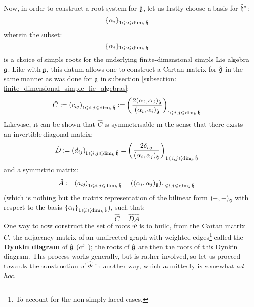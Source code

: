         Now, in order to construct a root system for $\hat{\mathfrak{g}}$, let us firstly choose a basis for $\hat{\mathfrak{h}}^*$:
            $$\{\alpha_i\}_{1 \leqslant i \leqslant \dim_k \hat{\mathfrak{h}}}$$
        wherein the subset:
            $$\{\alpha_i\}_{1 \leqslant i \leqslant \dim_k \mathfrak{h}}$$
        is a choice of simple roots for the underlying finite-dimensional simple Lie algebra $\mathfrak{g}$. Like with $\mathfrak{g}$, this datum allows one to construct a Cartan matrix for $\hat{\mathfrak{g}}$ in the same manner as was done for $\mathfrak{g}$ in subsection \ref{subsection: finite_dimensional_simple_lie_algebras}:
            $$\hat{C} := (c_{ij})_{1 \leqslant i, j \leqslant \dim_k \hat{\mathfrak{h}}} := \left( \frac{2(\alpha_i, \alpha_j)_{\hat{\mathfrak{g}}}}{(\alpha_i, \alpha_i)_{\hat{\mathfrak{g}}}} \right)_{1 \leqslant i, j \leqslant \dim_k \hat{\mathfrak{h}}}$$
        Likewise, it can be shown that $\hat{C}$ is symmetrisable in the sense that there exists an invertible diagonal matrix:
            $$\hat{D} := (d_{ij})_{1 \leqslant i, j \leqslant \dim_k \hat{\mathfrak{h}}} = \left(\frac{2\delta_{i, j}}{(\alpha_i, \alpha_j)_{\hat{\mathfrak{g}}}}\right)_{1 \leqslant i, j \leqslant \dim_k \hat{\mathfrak{h}}}$$
        and a symmetric matrix:
            $$\hat{A} := (a_{ij})_{1 \leqslant i, j \leqslant \dim_k \hat{\mathfrak{h}}} = \left((\alpha_i, \alpha_j)_{\hat{\mathfrak{g}}}\right)_{1 \leqslant i, j \leqslant \dim_k \hat{\mathfrak{h}}}$$
        (which is nothing but the matrix representation of the bilinear form $(-, -)_{\hat{\mathfrak{g}}}$ with respect to the basis $\{\alpha_i\}_{1 \leqslant i \leqslant \dim_k \hat{\mathfrak{h}}}$), such that:
            $$\hat{C} = \hat{D} \hat{A}$$
        One way to now construct the set of roots $\hat{\Phi}$ is to build, from the Cartan matrix $\hat{C}$, the adjacency matrix of an undirected graph with weighted edges\footnote{To account for the non-simply laced cases.} called the \textbf{Dynkin diagram} of $\hat{\mathfrak{g}}$ (cf. \cite[Section 4.7]{kac_infinite_dimensional_lie_algebras}); the roots of $\hat{\mathfrak{g}}$ are then the roots of this Dynkin diagram. This process works generally, but is rather involved, so let us proceed towards the construction of $\hat{\Phi}$ in another way, which admittedly is somewhat \textit{ad hoc}.
        
